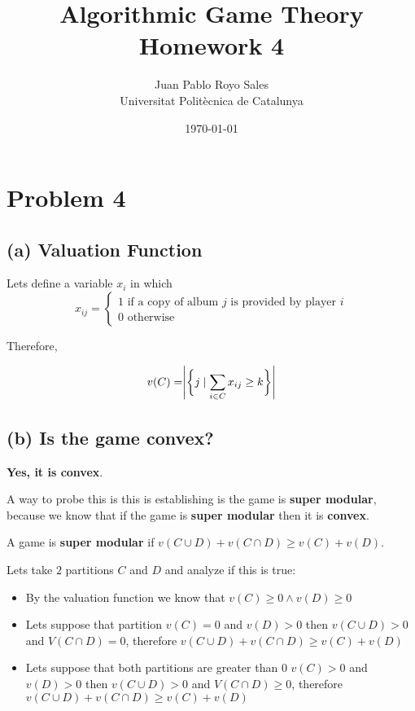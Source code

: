 \documentclass[12pt, a4paper]{article}
\title{%
  Algorithmic Game Theory \\
  Homework 4
}
\author{%
  Juan Pablo Royo Sales\\
  \small{Universitat Politècnica de Catalunya}
}
\date\today
\begin{document}
\maketitle

\section{Problem 4}
\subsection{(a) Valuation Function}
Lets define a variable $x_i$ in which 
\[
x_{ij} = 
\begin{cases}
  1 \text{ if a copy of album } j \text{ is provided by player } i\\
  0 \text{ otherwise } 
\end{cases}
\]

Therefore, 

\begin{equation*}
  v(C) = \Biggr|\biggr\{j \mid \sum_{i \in C} x_{ij} \geq k \biggl\}\Biggl|\\
\end{equation*}

\subsection{(b) Is the game convex?}
\textbf{Yes, it is convex}.

A way to probe this is this is establishing is the game is \textbf{super modular}, because 
we know that if the game is \textbf{super modular} then it is \textbf{convex}.

A game is \textbf{super modular} if $v(C \cup D) + v(C \cap D) \geq v(C) + v(D)$.

Lets take $2$ partitions $C$ and $D$ and analyze if this is true:

\begin{itemize}
  \item By the valuation function we know that $v(C) \geq 0 \land v(D) \geq 0$
  \item Lets suppose that partition $v(C) = 0$ and $v(D) > 0$ then $v(C \cup D) > 0$ and $V(C \cap D) = 0$, therefore $v(C \cup D) + v(C \cap D) \geq v(C) + v(D)$
  \item Lets suppose that both partitions are greater than 0 $v(C) > 0$ and $v(D) > 0$ then $v(C \cup D) > 0$ and $V(C \cap D) \geq 0$, therefore $v(C \cup D) + v(C \cap D) \geq v(C) + v(D)$ 
\end{itemize}
\end{document}
